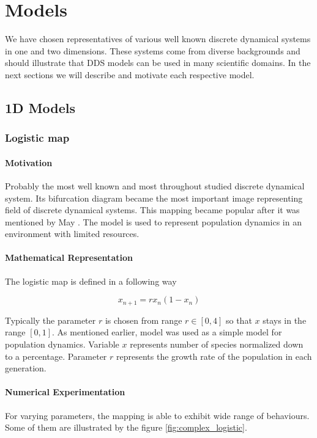 \chapter{Models}
We have chosen representatives of various well known discrete dynamical systems in one and two dimensions. These systems come from diverse backgrounds and should illustrate that DDS models can be used in many scientific domains. In the next sections we will describe and motivate each respective model.

\section{1D Models}

\subsection{Logistic map}
\label{subsec:logistic map}

\subsubsection{Motivation}
Probably the most well known and most throughout studied discrete dynamical system.
Its bifurcation diagram became the most important image representing field of discrete dynamical systems.
This mapping became popular after it was mentioned by May \cite{May19760610}.
The model is used to represent population dynamics in an environment with limited resources.

\subsubsection{Mathematical Representation}
The logistic map is defined in a following way

\begin{equation}
    x_{n+1} = r x_{n} ( 1 - x_{n} )
\end{equation}

Typically the parameter $r$ is chosen from range $r \in [0, 4]$ so that $x$ stays in the range $[0,1]$.
As mentioned earlier, model was used as a simple model for population dynamics.
Variable $x$ represents number of species normalized down to a percentage.
Parameter $r$ represents the growth rate of the population in each generation.

\subsubsection{Numerical Experimentation}
For varying parameters, the mapping is able to exhibit wide range of behaviours.
Some of them are illustrated by the figure \ref{fig:complex_logistic}.

